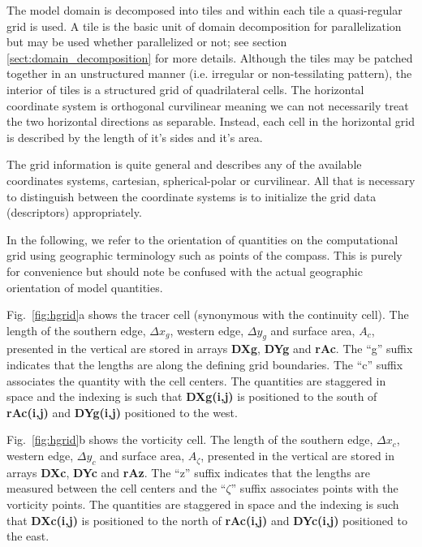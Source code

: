 The model domain is decomposed into tiles and within each tile a
quasi-regular grid is used. A tile is the basic unit of domain
decomposition for parallelization but may be used whether parallelized
or not; see section \ref{sect:domain_decomposition} for more details. 
Although the tiles may be patched together in an unstructured manner
(i.e. irregular or non-tessilating pattern), the interior of tiles is
a structured grid of quadrilateral cells. The horizontal coordinate
system is orthogonal curvilinear meaning we can not necessarily treat
the two horizontal directions as separable. Instead, each cell in the
horizontal grid is described by the length of it's sides and it's
area.

The grid information is quite general and describes any of the
available coordinates systems, cartesian, spherical-polar or
curvilinear. All that is necessary to distinguish between the
coordinate systems is to initialize the grid data (descriptors)
appropriately.

In the following, we refer to the orientation of quantities on the
computational grid using geographic terminology such as points of the
compass.
This is purely for convenience but should note be confused
with the actual geographic orientation of model quantities.

Fig.~\ref{fig:hgrid}a shows the tracer cell (synonymous with the
continuity cell). The length of the southern edge, $\Delta x_g$,
western edge, $\Delta y_g$ and surface area, $A_c$, presented in the
vertical are stored in arrays {\bf DXg}, {\bf DYg} and {\bf rAc}.
The ``g'' suffix indicates that the lengths are along the defining
grid boundaries. The ``c'' suffix associates the quantity with the
cell centers. The quantities are staggered in space and the indexing
is such that {\bf DXg(i,j)} is positioned to the south of {\bf
rAc(i,j)} and {\bf DYg(i,j)} positioned to the west.

Fig.~\ref{fig:hgrid}b shows the vorticity cell. The length of the
southern edge, $\Delta x_c$, western edge, $\Delta y_c$ and surface
area, $A_\zeta$, presented in the vertical are stored in arrays {\bf
DXc}, {\bf DYc} and {\bf rAz}.
The ``z'' suffix indicates that the lengths are measured between the
cell centers and the ``$\zeta$'' suffix associates points with the
vorticity points. The quantities are staggered in space and the
indexing is such that {\bf DXc(i,j)} is positioned to the north of
{\bf rAc(i,j)} and {\bf DYc(i,j)} positioned to the east.

